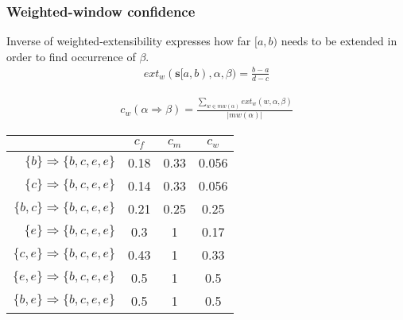\documentclass[dvipsnames]{beamer}
\newcommand{\sequencetickmarks}[3]
{
    \pgfmathsetmacro\secondtickmark{#2+0.5}
    \pgfmathsetmacro\lasttickmark{#2+0.5*#1}

    \draw (#2,#3) -- (\lasttickmark,#3);

    \foreach \x in {#2,\secondtickmark,...,\lasttickmark}
        \draw (\x,#3) -- +(0,3pt);
}
\newcommand{\sequenceeventtypes}[4]
{
    \pgfmathsetlengthmacro\nodeheight{(#2)+(.8em)}

    \foreach \t/\eventtype [evaluate=\t as \x using (\t-#3)*0.5+(#1)] in {#4}
    {
        \node [font=\vphantom{$ fbd $}] at (\x,#2) {$ \eventtype $};
        \node (t\t) [inner sep=0] at (\x,\nodeheight) {};
    }
}
\newcommand{\examplesequence}
{
    \sequencetickmarks{23}{-5.5}{0}

    \sequenceeventtypes{-5.5}{1em}{30}{32/c,33/f,34/b,35/b,38/c,40/d,41/a,44/b,46/e,47/a,48/e,49/c};
}
\begin{document}
\begin{frame}
\frametitle{Weighted-window confidence}

Inverse of weighted-extensibility expresses how far $ [a, b) $ needs to be extended in order to find occurrence of $ \beta $.
\begin{align*}
ext_w(\boldsymbol{s}[a, b), \alpha, \beta) = \frac{b - a}{d - c}
\end{align*}

\begin{align*}
c_w(\alpha \Rightarrow \beta) = \frac{\sum_{w \in mw(\alpha)} ext_w(w, \alpha, \beta)}{| mw(\alpha) |}
\end{align*}

\end{frame}
\begin{frame}
\begin{center}
\end{center}
\begin{center}
\begin{tabulary}{\textwidth}{R|S|S|S}
& $ c_f $ & $ c_m $ & $ c_w $ \\
\hline
$ \{ b \}    \Rightarrow \{ b, c, e, e \} $ & 0.18 & 0.33 & 0.056 \\
$ \{ c \}    \Rightarrow \{ b, c, e, e \} $ & 0.14 & 0.33 & 0.056 \\
$ \{ b, c \} \Rightarrow \{ b, c, e, e \} $ & 0.21 & 0.25 & 0.25 \\
$ \{ e \}    \Rightarrow \{ b, c, e, e \} $ & 0.3  & 1    & 0.17 \\
$ \{ c, e \} \Rightarrow \{ b, c, e, e \} $ & 0.43 & 1    & 0.33 \\
$ \{ e, e \} \Rightarrow \{ b, c, e, e \} $ & 0.5  & 1    & 0.5 \\
$ \{ b, e \} \Rightarrow \{ b, c, e, e \} $ & 0.5  & 1    & 0.5 \\
\end{tabulary}
\end{center}
\end{frame}
\end{document}
